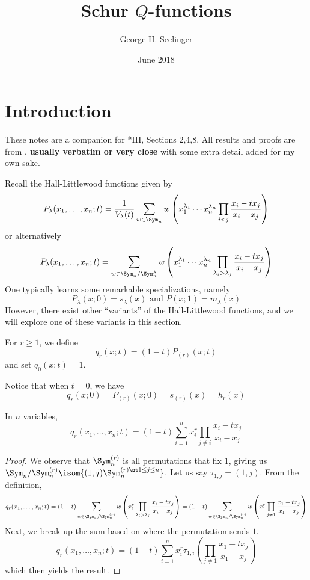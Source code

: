 \documentclass[11pt,leqno,oneside]{amsart}
\title[Schur \(Q\)-functions]{Schur \(Q\)-functions}
\author{George H. Seelinger}
\date{June 2018}
\numberwithin{thm}{section}
\begin{document}
\maketitle
\section{Introduction}
These notes are a companion for \cite{macdonald}*{III, Sections 2,4,8}. All results and proofs are from \cite{macdonald}, \textbf{usually
verbatim or very close} with some extra detail added for my own sake.

Recall the Hall-Littlewood functions given by \[
  P_\lambda(x_1, \ldots, x_n;t) = \frac{1}{V_\lambda(t)} \sum_{w \in
    \Sym_n} w\left( x_1^{\lambda_1} \cdots x_n^{\lambda_n} \prod_{i <
      j} \frac{x_i-tx_j}{x_i-x_j} \right)
\]
or alternatively \[
  P_\lambda(x_1, \ldots, x_n;t) = \sum_{w \in \Sym_n / \Sym_n^\lambda}
  w \left( x_1^{\lambda_1} \cdots x_n^{\lambda_n} \prod_{\lambda_i >
      \lambda_j} \frac{x_i - t x_j}{x_i - x_j} \right)
\]
One typically learns some remarkable specializations, namely \[
  P_\lambda(x;0) = s_\lambda(x) \text{ and } P(x;1) = m_\lambda(x)
\]
However, there exist other ``variants'' of the Hall-Littlewood
functions, and we will explore one of these variants in this section.
\begin{defn}
  For \(r \geq 1\), we define \[
    q_r(x;t) = (1-t)P_{(r)}(x;t)
  \]
  and set \(q_0(x;t) = 1\). 
\end{defn}
\begin{rmk}
  Notice that when \(t=0\), we have \[
    q_r(x;0) = P_{(r)}(x;0) = s_{(r)}(x) = h_{r}(x)
  \]
\end{rmk}
\begin{prop}
  In \(n\) variables, \[
    q_r(x_1,\ldots,x_n;t) = (1-t) \sum_{i=1}^n x_i^r \prod_{j \neq i}
    \frac{x_i-tx_j}{x_i-x_j}
  \]
\end{prop}
\begin{proof}
  We observe that \(\Sym_n^{(r)}\) is all permutations that fix
  \(1\), giving us \(\Sym_n / \Sym_n^{(r)} \isom \{(1,j)
  \Sym_n^{(r) \st 1 \leq j \leq n}\}\). Let us say \(\tau_{1,j} =
  (1,j)\).  From the definition, \[
    q_r(x_1, \ldots, x_n;t) = (1-t) \sum_{w \in \Sym_n / \Sym_n^{(r)}}
    w \left( x_1^r \prod_{\lambda_i > \lambda_j} 
      \frac{x_i-tx_j}{x_i-x_j} \right) = (1-t) \sum_{w \in
      \Sym_n/\Sym_n^{(r)}}w \left( x_1^r \prod_{j \neq 1}
      \frac{x_1-tx_j}{x_1-x_j}
    \right) 
  \]
  Next, we break up the sum based on
  where the permutation sends \(1\). \[
    q_r(x_1, \ldots, x_n;t) = (1-t) \sum_{i=1}^n x_i^r \tau_{1,i}
  \left( \prod_{j \neq 1} \frac{x_1-tx_j}{x_1-x_j} 
    \right)
  \]
  which then yields the result.
\end{proof}
\end{document}
